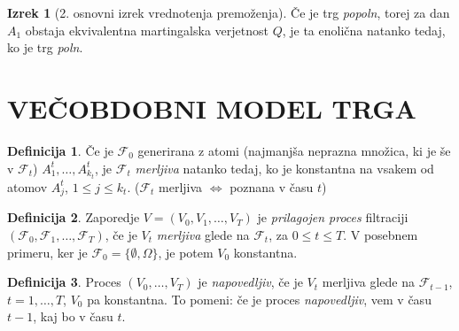 \documentclass[11pt]{article}
\newcommand{\F}{\mathcal{F}}
\theoremstyle{definition}
\newtheorem{definicija}{Definicija}[section]
\theoremstyle{definition}
\newtheorem{izrek}{Izrek}[section]
\begin{document}
\begin{izrek}[2. osnovni izrek vrednotenja premoženja]

Če je trg \textit{popoln}, torej za dan $A_1$ obstaja ekvivalentna martingalska verjetnost $Q$, je ta enolična natanko tedaj, ko je trg \textit{poln}.

\end{izrek}
\vspace{0.5cm}

\pagebreak


\section{VEČOBDOBNI MODEL TRGA}
\vspace{0.5cm}

\begin{definicija}

Če je $\F_0$ generirana z atomi (najmanjša neprazna množica, ki je še v $\F_t$) $A_1^t,\ldots, A_{k_t}^t$, je $\F_t$ \textit{merljiva} natanko tedaj, ko je konstantna na vsakem od atomov $A_j^t$, $1 \leq j \leq k_t$. ($\F_t$ merljiva $\iff$ poznana v času $t$)

\end{definicija}
\vspace{0.5cm}

\begin{definicija}

Zaporedje $V = (V_0, V_1,\ldots, V_T)$ je \textit{prilagojen proces} filtraciji $(\F_0, \F_1,\ldots, \F_T)$, če je $V_t$ \textit{merljiva} glede na $\F_t$, za $0 \leq t \leq T$. V posebnem primeru, ker je $\F_0 = \{\emptyset, \Omega\}$, je potem $V_0$ konstantna.

\end{definicija}
\vspace{0.5cm}

\begin{definicija}

Proces $(V_0,\ldots, V_T)$ je \textit{napovedljiv}, če je $V_t$ merljiva glede na $\F_{t-1}$, $t=1,\ldots, T$, $V_0$ pa konstantna. To pomeni: če je proces \textit{napovedljiv}, vem v času $t-1$, kaj bo v času $t$.

\end{definicija}
\vspace{0.5cm}
\end{document}
